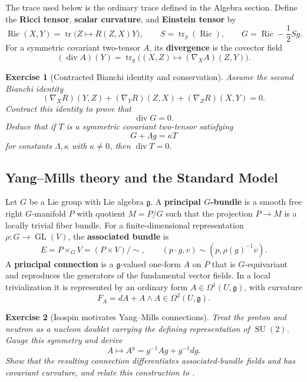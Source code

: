 \documentclass{article}
\newtheorem{exercise}{Exercise}
\begin{document}
The trace used below is the ordinary trace defined in the Algebra section. Define the \textbf{Ricci tensor}, \textbf{scalar curvature}, and \textbf{Einstein tensor} by
\[
\operatorname{Ric}(X,Y)=\operatorname{tr}\bigl(Z\mapsto R(Z,X)Y\bigr),
\qquad
S=\operatorname{tr}_g(\operatorname{Ric}),
\qquad
G=\operatorname{Ric}-\frac12Sg.
\]
For a symmetric covariant two-tensor $A$, its \textbf{divergence} is the covector field
\[
(\operatorname{div}A)(Y)
=\operatorname{tr}_g\bigl((X,Z)\mapsto(\nabla_XA)(Z,Y)\bigr).
\]

\begin{exercise}[Contracted Bianchi identity and conservation]\leavevmode\par
\textit{Assume the second Bianchi identity}
\[
(\nabla_XR)(Y,Z)+(\nabla_YR)(Z,X)+(\nabla_ZR)(X,Y)=0.
\]
\textit{Contract this identity to prove that}
\[
\operatorname{div}G=0.
\]
\textit{Deduce that if $T$ is a symmetric covariant two-tensor satisfying}
\[
G+\Lambda g=\kappa T
\]
\textit{for constants $\Lambda,\kappa$ with $\kappa\ne0$, then $\operatorname{div}T=0$.}
\end{exercise}

\subsection{Yang--Mills theory and the Standard Model}

Let $G$ be a Lie group with Lie algebra $\mathfrak g$. A \textbf{principal $G$-bundle} is a smooth free right $G$-manifold $P$ with quotient $M=P/G$ such that the projection $P\to M$ is a locally trivial fiber bundle. For a finite-dimensional representation $\rho:G\to\operatorname{GL}(V)$, the \textbf{associated bundle} is
\[
E=P\times_G V=(P\times V)/\sim,
\qquad
(p\cdot g,v)\sim(p,\rho(g)^{-1}v).
\]
A \textbf{principal connection} is a $\mathfrak g$-valued one-form $A$ on $P$ that is $G$-equivariant and reproduces the generators of the fundamental vector fields. In a local trivialization it is represented by an ordinary form $A\in\Omega^1(U,\mathfrak g)$, with curvature
\[
F_A=dA+A\wedge A\in\Omega^2(U,\mathfrak g).
\]
\begin{exercise}[Isospin motivates Yang--Mills connections]\leavevmode\par
\textit{Treat the proton and neutron as a nucleon doublet carrying the
defining representation of $\operatorname{SU}(2)$. Gauge this symmetry and
derive}
\[
A\longmapsto A^g=g^{-1}Ag+g^{-1}dg.
\]
\textit{Show that the resulting connection differentiates associated-bundle
fields and has covariant curvature, and relate this construction to
\cite{yang-mills}.}
\end{exercise}
\end{document}

